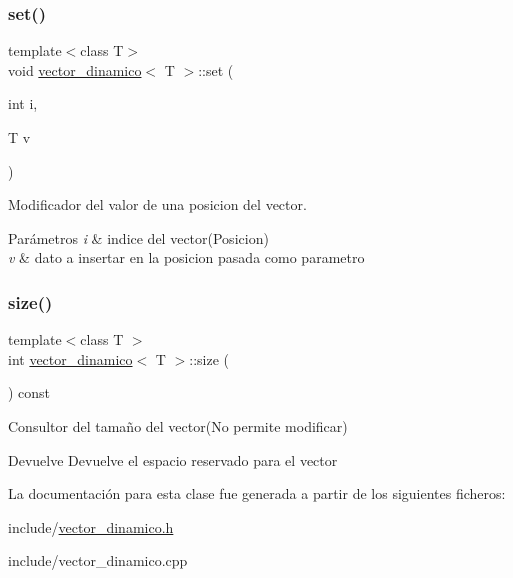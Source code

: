 \subsubsection{\texorpdfstring{set()}{set()}}
{\footnotesize\ttfamily template$<$class T$>$ \\
void \hyperlink{classvector__dinamico}{vector\+\_\+dinamico}$<$ T $>$\+::set (\begin{DoxyParamCaption}\item[{int}]{i,  }\item[{T}]{v }\end{DoxyParamCaption})}



Modificador del valor de una posicion del vector. 


\begin{DoxyParams}{Parámetros}
{\em i} & indice del vector(\+Posicion) \\
\hline
{\em v} & dato a insertar en la posicion pasada como parametro \\
\hline
\end{DoxyParams}
\mbox{\label{classvector__dinamico_a196f12479a340f66a26e59eadec6e4e6}} 
\subsubsection{\texorpdfstring{size()}{size()}}
{\footnotesize\ttfamily template$<$class T $>$ \\
int \hyperlink{classvector__dinamico}{vector\+\_\+dinamico}$<$ T $>$\+::size (\begin{DoxyParamCaption}{ }\end{DoxyParamCaption}) const}



Consultor del tamaño del vector(\+No permite modificar) 

\begin{DoxyReturn}{Devuelve}
Devuelve el espacio reservado para el vector 
\end{DoxyReturn}


La documentación para esta clase fue generada a partir de los siguientes ficheros\+:\begin{DoxyCompactItemize}
\item 
include/\hyperlink{vector__dinamico_8h}{vector\+\_\+dinamico.\+h}\item 
include/vector\+\_\+dinamico.\+cpp\end{DoxyCompactItemize}
